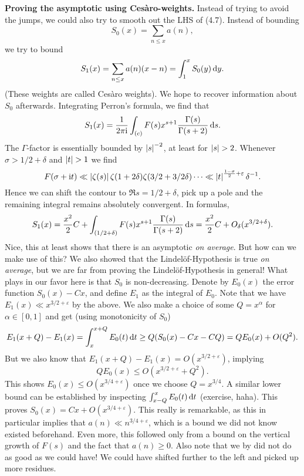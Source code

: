 \documentclass[a4paper,11pt]{article}
\begin{document}
\textbf{Proving the asymptotic using Cesàro-weights.} Instead of trying to avoid
the jumps, we could also try to smooth out the LHS of (4.7). Instead of bounding
\[
    S_0(x) = \sum_{n \leq x} a(n),
\]
we try to bound
\[
    S_1(x) = \sum_{n \leq x} a(n) (x-n) = \int_1^x S_0(y) \mathrm{\,d} y.
\]
(These weights are called Cesàro weights). We hope to recover information about 
$S_0$ afterwards. 
Integrating Perron's formula, we find that 
\[
    S_1(x) = \frac{1}{2 \pi \mathrm i} \int_{(c)} F(s) x^{s+1} \frac{\Gamma(s)}{\Gamma(s+2)} \mathrm{\,d} s.
\]
The $\Gamma$-factor is essentially bounded by $\left\lvert s \right\rvert^{-2}$, at least for 
$\left\lvert s \right\rvert > 2$. Whenever $\sigma > 1/2 + \delta$ and $\left\lvert t \right\rvert > 1$ we find  
$$F(\sigma + \mathrm i t) \ll \left\lvert \zeta(s) \right\rvert \zeta(1+2\delta) \zeta(3/2+3/2\delta) \cdots
\ll \left\lvert t \right\rvert^{\frac {1-\sigma}2 + \varepsilon} \delta^{-1}.$$
Hence we can shift the contour to $\Re s = 1/2+\delta$, pick up a pole and the 
remaining integral remains absolutely convergent. In formulas,
\[
    S_1(x) = \frac{x^2}2 C + \int_{(1/2+\delta)} F(s) x^{s+1}
    \frac{\Gamma(s)}{\Gamma(s+2)} \mathrm{\,d} s = \frac{x^2}2 C +
    O_\delta(x^{3/2+\delta}).
\]
Nice, this at least shows that there is an asymptotic \textit{on average}. But
how can we make use of this? We also showed that the Lindelöf-Hypothesis is true
\textit{on average}, but we are far from proving the Lindelöf-Hypothesis in
general! What plays in our favor here is that $S_0$ is non-decreasing. Denote
by $E_0(x)$ the error function $S_0(x) - Cx$, and define $E_1$ as the integral
of $E_0$. Note that we have $E_1(x) \ll x^{3/2+\varepsilon}$ by the above. 
We also make a choice of some $Q = x^\alpha$ for $\alpha \in [0,1]$ and get
(using monotonicity of $S_0$)
\[
    E_1(x+Q)-E_1(x) = \int_x^{x+Q} E_0(t) \mathrm{\,d} t \geq Q(S_0(x) - Cx - CQ) = QE_0(x) + O(Q^2).
\]
But we also know that $E_1(x+Q)-E_1(x) = O(x^{3/2+\varepsilon})$, implying
\[
    QE_0(x) \leq O(x^{3/2+\varepsilon}+Q^2).
\]
This shows $E_0(x) \leq O(x^{3/4+\varepsilon})$ once we choose $Q=x^{3/4}$. A similar
lower bound can be established by inspecting $\int_{x-Q}^x E_0(t) \mathrm{\,d} t$ (exercise, 
haha). This proves $S_0(x) = Cx + O(x^{3/4+\varepsilon})$. This really is remarkable,
as this in particular implies that $a(n) \ll n^{3/4 + \varepsilon}$, which is a 
bound we did not know existed beforehand. Even more, this followed only from a
bound on the vertical growth of $F(s)$ and the fact 
that $a(n) \geq 0$. Also note that we by did not do as good as we could have! 
We could have shifted further to the left and picked up more residues. 


\contactend
\end{document}
